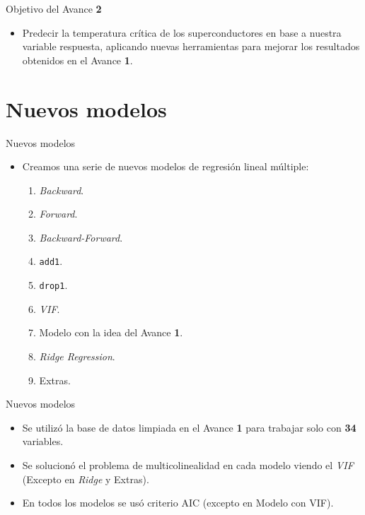 \documentclass[11pt]{beamer}\usepackage{knitr}
\newcommand{\cod}[1]{\texttt{\frenchspacing#1}}
\begin{document}
\begin{frame}{Objetivo del Avance \textbf{2}}
	\begin{itemize}
		\item Predecir la temperatura crítica de los superconductores en base a nuestra variable respuesta, aplicando nuevas herramientas para mejorar los resultados obtenidos en el Avance \textbf{1}.
	\end{itemize}
\end{frame}


\section{Nuevos modelos}

\begin{frame}{Nuevos modelos}
	\begin{itemize}
		\item Creamos una serie de nuevos modelos de regresión lineal múltiple:
		\begin{enumerate}
			\item \textit{Backward}.
			\pause
			\item \textit{Forward}.
			\pause
			\item \textit{Backward-Forward}.
			\pause
			\item \cod{add1}.
			\pause
			\item \cod{drop1}.
			\pause
			\item \textit{VIF}.
			\pause
			\item Modelo con la idea del Avance \textbf{1}.
			\pause
			\item \textit{Ridge Regression}.
			\pause
			\item Extras.
		\end{enumerate}
	\end{itemize}
\end{frame}

\begin{frame}{Nuevos modelos}
	\begin{itemize}
		\item Se utilizó la base de datos limpiada en el Avance \textbf{1} para trabajar solo con \textbf{34} variables.
		\pause
		\item Se solucionó el problema de multicolinealidad en cada modelo viendo el \textit{VIF} (Excepto en \textit{Ridge} y Extras).
		\pause
		\item En todos los modelos se usó criterio AIC (excepto en Modelo con VIF).
	\end{itemize}
\end{frame}
\end{document}
